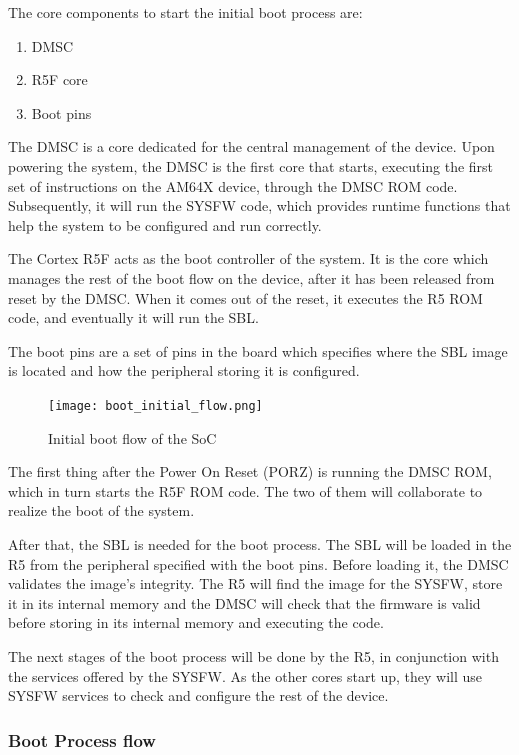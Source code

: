 The core components to start the initial boot process are:

\begin{enumerate}
    \item   DMSC
    \item   R5F core
    \item   Boot pins
\end{enumerate}

The DMSC is a core dedicated for the central management of the device.
\cite{Technical_reference_AM64}
Upon powering the system, the DMSC is the first core that starts, executing 
the first set of instructions on the AM64X device, through the DMSC ROM code.
Subsequently, it will run the SYSFW code, which provides runtime functions that
help the system to be configured and run correctly.

The Cortex R5F acts as the boot controller of the system.
It is the core which manages the rest of the boot flow on the device, after it
has been released from reset by the DMSC. When it comes out of the reset, it
executes the R5 ROM code, and eventually it will run the SBL.

The boot pins are a set of pins in the board which specifies where the SBL
image is located and how the peripheral storing it is configured. 

\begin{figure}[H]
    \centering
    \texttt{[image: boot\_initial\_flow.png]}
    \caption{Initial boot flow of the SoC}
\end{figure}

The first thing after the Power On Reset (PORZ) is running the DMSC ROM, which
in turn starts the R5F ROM code. The two of them will collaborate to realize
the boot of the system.

After that, the SBL is needed for the boot process. The SBL will be loaded in
the R5 from the peripheral specified with the boot pins.
Before loading it, the DMSC validates the image's integrity. 
The R5 will find the image for the SYSFW, store it in its internal memory and
the DMSC will check that the firmware is valid before storing in its internal
memory and executing the code.

The next stages of the boot process will be done by the R5, in conjunction with
the services offered by the SYSFW. As the other cores start up, they will use
SYSFW services to check and configure the rest of the device.

\subsubsection{Boot Process flow}

